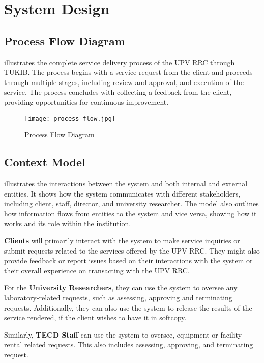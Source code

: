 \section{System Design}

\subsection{Process Flow Diagram}

 illustrates the complete service delivery process of the UPV RRC through TUKIB. The process begins with a service request from the client and proceeds through multiple stages, including review and approval, and execution of the service. The process concludes with collecting a feedback from the client, providing opportunities for continuous improvement.

\begin{figure}[h]
	\centering 
	\texttt{[image: process\_flow.jpg]}
	\caption{Process Flow Diagram}
	\label{fig:process_flow}
\end{figure}

\newpage

\subsection{Context Model}

 illustrates the interactions between the system and both internal and external entities. It shows how the system communicates with different stakeholders, including client, staff, director, and university researcher. The model also outlines how information flows from entities to the system and vice versa, showing how it works and its role within the institution.

\textbf{Clients} will primarily interact with the system to make service inquiries or submit requests related to the services offered by the UPV RRC. They might also provide feedback or report issues based on their interactions with the system or their overall experience on transacting with the UPV RRC.

For the \textbf{University Researchers}, they can use the system to oversee any laboratory-related requests, such as assessing, approving and terminating requests. Additionally, they can also use the system to release the results of the service rendered, if the client wishes to have it in softcopy. 

Similarly, \textbf{TECD Staff} can use the system to oversee, equipment or facility rental related requests. This also includes assessing, approving, and terminating request. 

